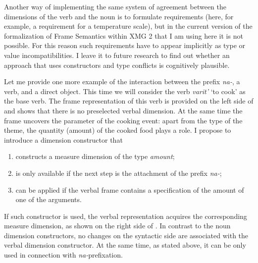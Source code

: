 Another way of implementing the same system of agreement between the dimensions of the verb and the noun is to formulate requirements (here, for example, a requirement for a temperature scale), but in the current version of the formalization of Frame Semantics within XMG 2 that I am using here it is not possible. For this reason such requirements have to appear implicitly as type or value incompatibilities. I leave it to future research to find out whether an approach that uses constructors and type conflicts is cognitively plausible.


Let me provide one more example of the interaction between the prefix \textit{na-}, a verb, and a direct object. This time we will consider the verb \textit{varit'} `to cook' as the base verb. The frame representation of this verb is provided on the left side of  and shows that there is no preselected verbal dimension. At the same time the frame uncovers the parameter of the cooking event: apart from the type of the theme, the quantity (amount) of the cooked food plays a role. I propose to introduce a dimension constructor that
\begin{enumerate}
\item constructs a measure dimension of the type \textit{amount};
\item is only available if the next step is the attachment of the prefix \textit{na-};
\item can be applied if the verbal frame contains a specification of the amount of one of the arguments.
\end{enumerate}

If such constructor is used, the verbal representation acquires the corresponding measure dimension, as shown on the right side of . In contrast to the noun dimension constructors, no changes on the syntactic side are associated with the verbal dimension constructor. At the same time, as stated above, it can be only used in connection with \textit{na-}prefixation. 

